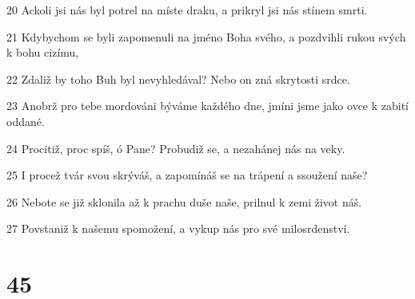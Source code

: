 \par 20 Ackoli jsi nás byl potrel na míste draku, a prikryl jsi nás stínem smrti.
\par 21 Kdybychom se byli zapomenuli na jméno Boha svého, a pozdvihli rukou svých k bohu cizímu,
\par 22 Zdaliž by toho Buh byl nevyhledával? Nebo on zná skrytosti srdce.
\par 23 Anobrž pro tebe mordováni býváme každého dne, jmíni jsme jako ovce k zabití oddané.
\par 24 Procitiž, proc spíš, ó Pane? Probudiž se, a nezahánej nás na veky.
\par 25 I procež tvár svou skrýváš, a zapomínáš se na trápení a ssoužení naše?
\par 26 Nebote se již sklonila až k prachu duše naše, prilnul k zemi život náš.
\par 27 Povstaniž k našemu spomožení, a vykup nás pro své milosrdenství.

\chapter{45}

